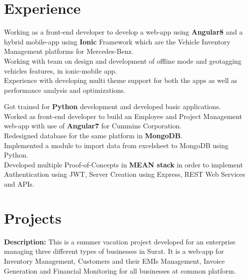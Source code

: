 \documentclass[]{jaydeep-resume-openfont}
\begin{document}
\begin{minipage}[t]{0.70\textwidth}


\section{Experience}

\textbullet{} Working as a front-end developer to develop a web-app using \textbf{Angular8} and a hybrid mobile-app using \textbf{Ionic} Framework which are the Vehicle Inventory Management platforms for Mercedes-Benz.\\
\textbullet{} Working with team on design and development of offline mode and geotagging vehicles features, in ionic-mobile app. \\
\textbullet{} Experience with developing multi theme support for both the apps as well as performance analysis and optimizations. \\
\sectionsep

\textbullet{} Got trained for \textbf{Python}  development and developed basic applications.\\
\textbullet{} Worked as front-end developer to build an Employee and Project Management web-app with use of \textbf{Angular7} for Cummins Corporation. \\
\textbullet{} Redesigned database for the same platform in \textbf{MongoDB}. \\
\textbullet{} Implemented a module to import data from excelsheet to MongoDB using Python. \\
\textbullet{} Developed multiple Proof-of-Concepts in \textbf{MEAN stack} in order to implement Authentication using JWT, Server Creation using Express, REST Web Services and APIs. \\
\sectionsep

\section{Projects}

\textbf{Description:} This is a summer vacation project developed for an enterprise managing three different types of businesses in Surat. It is a web-app for Inventory Management, Customers and their EMIs Management, Invoice Generation and Financial Monitoring for all businesses at common platform.\\
\sectionsep


\end{minipage}
\end{document}
